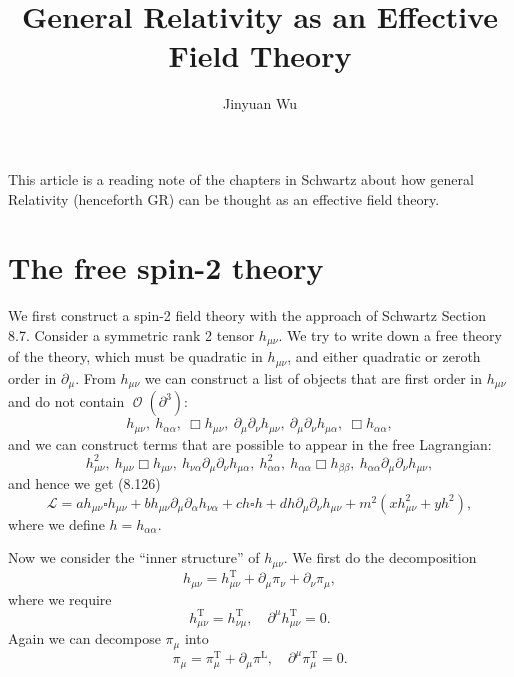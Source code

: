 \documentclass[hyperref, a4paper]{article}
\title{General Relativity as an Effective Field Theory}
\author{Jinyuan Wu}
\DeclareMathOperator{\bigO}{\mathcal{O}}
\begin{document}
\maketitle

This article is a reading note of the chapters in Schwartz about how general Relativity (henceforth GR) can
be thought as an effective field theory. 

\section{The free spin-2 theory}

We first construct a spin-2 field theory with the approach of Schwartz Section 8.7. 
Consider a symmetric rank 2 tensor $h_{\mu \nu}$. We try to write down a free theory of the theory, which 
must be quadratic in $h_{\mu \nu}$, and either quadratic or zeroth order in $\partial_\mu$. From $h_{\mu \nu}$ 
we can construct a list of objects that are first order in $h_{\mu \nu}$ and do not contain $\bigO(\partial^3)$:
\[
    h_{\mu \nu},\  h_{\alpha \alpha}, \ \Box h_{\mu \nu}, \ \partial_\mu \partial_\nu h_{\mu \nu}, \ 
    \partial_\mu \partial_\nu h_{\mu \alpha}, \ \Box h_{\alpha \alpha}, 
\]
and we can construct terms that are possible to appear in the free Lagrangian:
\[
    h_{\mu \nu}^2, \ h_{\mu \nu} \Box h_{\mu \nu}, \ h_{\nu \alpha} \partial_\mu \partial_\nu h_{\mu \alpha}, 
    \ h_{\alpha \alpha}^2, \ h_{\alpha \alpha} \Box h_{\beta \beta}, \ h_{\alpha \alpha} \partial_\mu \partial_\nu h_{\mu \nu},
\]
and hence we get (8.126) 
\begin{equation}
    \mathcal{L}=a h_{\mu \nu} \square h_{\mu \nu}+b h_{\mu \nu} \partial_{\mu} \partial_{\alpha} h_{\nu \alpha}+c h \square h + d h \partial_{\mu} \partial_{\nu} h_{\mu \nu}+m^{2}\left(x h_{\mu \nu}^{2}+y h^{2}\right),
    \label{eq:general-lag}
\end{equation}
where we define $h = h_{\alpha \alpha}$. 

Now we consider the ``inner structure'' of $h_{\mu \nu}$. We first do the decomposition 
\begin{equation}
    h_{\mu \nu} = h_{\mu\nu}^\text{T} + \partial_\mu \pi_\nu + \partial_\nu \pi_\mu,
\end{equation}
where we require  
\begin{equation}
    h_{\mu \nu}^\text{T} = h_{\nu \mu}^\text{T}, \quad \partial^\mu h_{\mu \nu}^\text{T} = 0.
\end{equation}
Again we can decompose $\pi_\mu$ into 
\begin{equation}
    \pi_{\mu}=\pi_{\mu}^\text{T}+\partial_{\mu} \pi^\text{L}, \quad \partial^\mu \pi_\mu^\text{T} = 0.
\end{equation}
\end{document}
